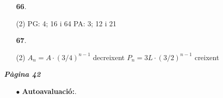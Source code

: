 \documentclass[a4paper, pdf, twoside]{book}
\begin{document}
\begin{multicols}{2}
\begin{enumerate}
 \item[\fontfamily{phv}\selectfont\color{blue}\textbf{66}. ] 
 \begin{tasks}[column-sep=1em, item-indent=1.3333em](2)
	 \task PG: 4; 16 i 64
	 \task PA: 3; 12 i 21
\end{tasks}
\vspace{0.25cm}



 \item[\fontfamily{phv}\selectfont\color{blue}\textbf{67}. ]  \scalebox{0.6}{\simbolclau } 
 \begin{tasks}[column-sep=1em, item-indent=1.3333em](2)
	 \task* $A_n = A \cdot (3/4)^{n-1}$ decreixent
	 \task* $P_n = 3L \cdot (3/2)^{n-1}$ creixent
\end{tasks}
 \end{enumerate}
\vspace{0.3cm}


{\textbf{\em Pàgina 42}} \hrulefill
\begin{enumerate}
\vspace{0.25cm}
 \item[$\bullet$ ] {\selectfont\color{blue}\textbf{Autoavaluació:}. }


\end{enumerate}
\end{multicols}
\end{document}
